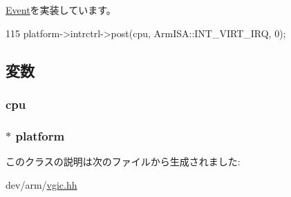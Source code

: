 \hyperlink{classEvent_a142b75b68a6291400e20fb0dd905b1c8}{Event}を実装しています。


\begin{DoxyCode}
115 { platform->intrctrl->post(cpu, ArmISA::INT_VIRT_IRQ, 0);}
\end{DoxyCode}


\subsection{変数}
\hypertarget{classVGic_1_1PostVIntEvent_a5af5cfc775318915ba91bd706254f4db}{
\subsubsection[{cpu}]{ {\bf cpu}}}
\label{classVGic_1_1PostVIntEvent_a5af5cfc775318915ba91bd706254f4db}
\hypertarget{classVGic_1_1PostVIntEvent_a75b48f1787959a4617f2a599d7c09aab}{
\subsubsection[{platform}]{$\ast$ {\bf platform}}}
\label{classVGic_1_1PostVIntEvent_a75b48f1787959a4617f2a599d7c09aab}


このクラスの説明は次のファイルから生成されました:\begin{DoxyCompactItemize}
\item 
dev/arm/\hyperlink{vgic_8hh}{vgic.hh}\end{DoxyCompactItemize}
